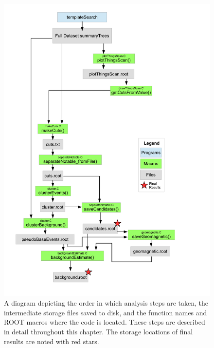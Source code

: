\begin{figure}
	\centering
	\includegraphics[height=0.8\textheight]{figures/AnalysisDiagram}
	\caption{A diagram depicting the order in which analysis steps are taken, the intermediate storage files saved to disk, and the function names and ROOT macros where the code is located.  These steps are described in detail throughout this chapter.  The storage locations of final results are noted with red stars.}
	\label{fig:AnalysisDiagram}
\end{figure}	
		
	

